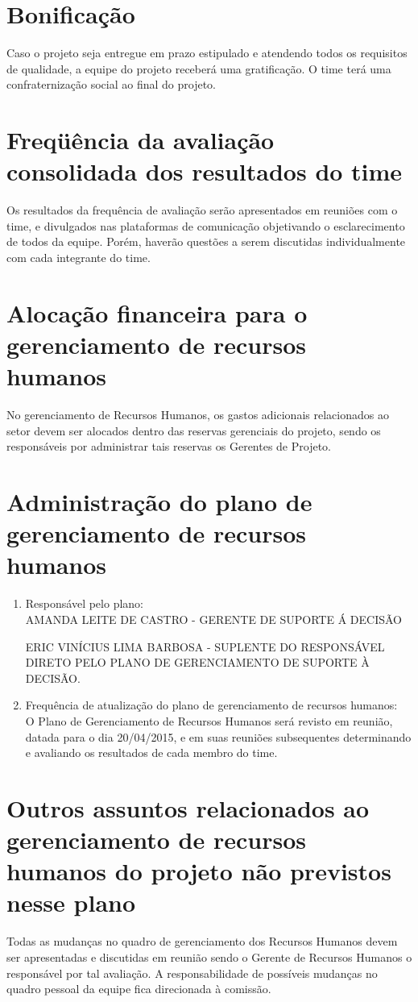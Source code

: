 \section*{Bonificação}
Caso o projeto seja entregue em prazo estipulado e atendendo todos os requisitos de qualidade, a equipe do projeto receberá uma gratificação. O time terá uma confraternização social ao final do projeto.

\section*{Freqüência da avaliação consolidada dos resultados do time}
Os resultados da frequência de avaliação serão apresentados em reuniões com o time, e divulgados nas plataformas de comunicação objetivando o esclarecimento de todos da equipe. Porém, haverão questões a serem discutidas individualmente com cada integrante do time.

\section*{Alocação financeira para o gerenciamento de recursos humanos}
No gerenciamento de Recursos Humanos, os gastos adicionais relacionados ao setor devem ser alocados dentro das reservas gerenciais do projeto, sendo os responsáveis por administrar tais reservas os Gerentes de Projeto.

\section*{Administração do plano de gerenciamento de recursos humanos}
\begin{enumerate}
 \item Responsável pelo plano:\\
 AMANDA LEITE DE CASTRO - GERENTE DE SUPORTE Á DECISÃO

ERIC VINÍCIUS LIMA BARBOSA - SUPLENTE DO RESPONSÁVEL DIRETO PELO PLANO DE GERENCIAMENTO DE SUPORTE À DECISÃO.
  \item Frequência de atualização do plano de gerenciamento de recursos humanos:\\
  O Plano de Gerenciamento de Recursos Humanos será revisto em reunião, datada para o dia 20/04/2015, e em suas reuniões subsequentes determinando e avaliando os resultados de cada membro do time.
\end{enumerate}

\section*{Outros assuntos relacionados ao gerenciamento de recursos humanos do projeto não previstos nesse plano}
Todas as mudanças no quadro de gerenciamento dos Recursos Humanos devem ser apresentadas e discutidas em reunião sendo o Gerente de Recursos Humanos o responsável por tal avaliação. A responsabilidade de possíveis mudanças no quadro pessoal da equipe fica direcionada à comissão.

